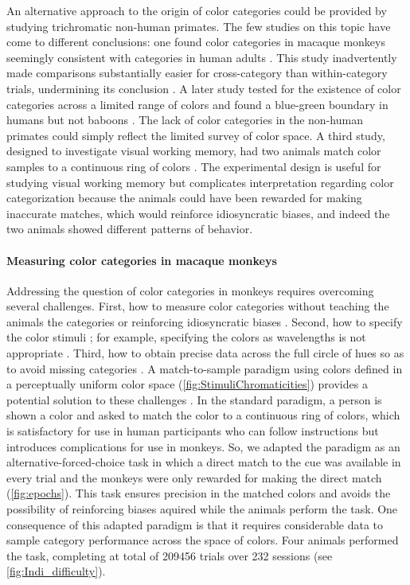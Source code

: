 An alternative approach to the origin of color categories could be provided by studying trichromatic non-human primates\citep{siuda-krzywicka_biological_2019}. 
The few studies on this topic have come to different conclusions: one found color categories in macaque monkeys seemingly consistent with categories in human adults \citep{sandell_color_1979}. 
This study inadvertently made comparisons substantially easier for cross-category than within-category trials, undermining its conclusion \citep{davidoff_cross-species_2010}. 
A later study tested for the existence of color categories across a limited range of colors and found a blue-green boundary in humans but not baboons \citep{fagot_cross-species_2006}.
The lack of color categories in the non-human primates could simply reflect the limited survey of color space. 
A third study, designed to investigate visual working memory, had two animals match color samples to a continuous ring of colors \citep{panichello_error-correcting_2019}. 
The experimental design is useful for studying visual working memory but complicates interpretation regarding color categorization because the animals could have been rewarded for making inaccurate matches, which would reinforce idiosyncratic biases, and indeed the two animals showed different patterns of behavior.

\paragraph{Measuring color categories in macaque monkeys}

Addressing the question of color categories in monkeys requires overcoming several challenges. 
First, how to measure color categories without teaching the animals the categories or reinforcing idiosyncratic biases \citep{essock_color_1977,matsuno_color_2004}.
Second, how to specify the color stimuli \citep{siuda-krzywicka_biological_2019}; for example, specifying the colors as wavelengths \citep{sandell_color_1979}
is not appropriate \citep{davidoff_cross-species_2010}. 
Third, how to obtain precise data across the full circle of hues so as to avoid missing categories \citep{fagot_cross-species_2006}.
A match-to-sample paradigm using colors defined in a perceptually uniform color space (\autoref{fig:StimuliChromaticities}) provides a potential solution to these challenges \citep{bae_why_2015}.
In the standard paradigm, a person is shown a color and asked to match the color to a continuous ring of colors, which is satisfactory for use in human participants who can follow instructions but introduces complications for use in monkeys.
So, we adapted the paradigm as an alternative-forced-choice task in which a direct match to the cue was available in every trial and the monkeys were only rewarded for making the direct match (\autoref{fig:epochs}). 
This task ensures precision in the matched colors and avoids the possibility of reinforcing biases aquired while the animals perform the task.
One consequence of this adapted paradigm is that it requires considerable data to sample category performance across the space of colors. 
Four animals performed the task, completing at total of 209456 trials over 232 sessions (see \autoref{fig:Indi_difficulty}).

